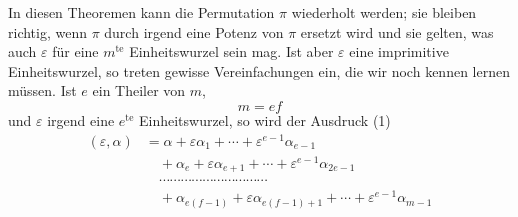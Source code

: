 In diesen Theoremen kann die Permutation $\pi$ wiederholt werden; sie bleiben richtig, wenn $\pi$ durch irgend eine Potenz von $\pi$ ersetzt wird und sie gelten, was auch $\varepsilon$ für eine $m^{\mathrm{te}}$ Einheitswurzel sein mag. Ist aber $\varepsilon$ eine imprimitive Einheitswurzel, so treten gewisse Vereinfachungen ein, die wir noch kennen lernen müssen. Ist $e$ ein Theiler von $m$,
\[
m = ef
\]
und $\varepsilon$ irgend eine $e^{\mathrm{te}}$ Einheitswurzel, so wird der Ausdruck (1)
\begin{align*}
(\varepsilon,\alpha) &= \alpha + \varepsilon\alpha_1 + \cdots + \varepsilon^{e-1}\alpha_{e-1}\\
&\quad + \alpha_e + \varepsilon\alpha_{e+1} + \cdots + \varepsilon^{e-1}\alpha_{2e-1}\\
&\quad \cdots\cdots\cdots\cdots\cdots\cdots\cdots\cdots\cdots\cdots\\
&\quad + \alpha_{e(f-1)} + \varepsilon\alpha_{e(f-1)+1} + \cdots + \varepsilon^{e-1}\alpha_{m-1}
\end{align*}
